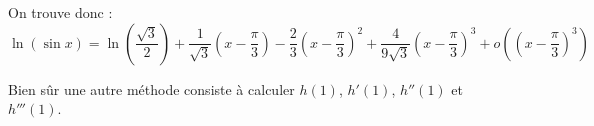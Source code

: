 {\begin{enumerate}
{On trouve donc :
$$\ln(\sin x) = \ln\left(\frac{\sqrt3}{2}\right) + \frac{1}{\sqrt 3}(x-\frac\pi3) 
 -\frac23 (x-\frac\pi3)^2 + \frac{4}{9\sqrt3}(x-\frac\pi3)^3 + o((x-\frac\pi3)^3)$$


\bigskip Bien sûr une autre méthode consiste à calculer $h(1)$, $h'(1)$, $h''(1)$ et $h'''(1)$.}
\end{enumerate}
}
